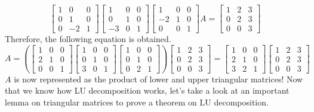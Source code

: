 \documentclass[../main.tex]{subfiles}
\begin{document}
\[
\begin{bmatrix}
    1 & 0  & 0 \\
    0 & 1  & 0 \\
    0 & -2 & 1
\end{bmatrix}
\begin{bmatrix}
    1  & 0 & 0 \\
    0  & 1 & 0 \\
    -3 & 0 & 1
\end{bmatrix}
\begin{bmatrix}
    1  & 0 & 0 \\
    -2 & 1 & 0 \\
    0  & 0 & 1
\end{bmatrix}
A
=
\begin{bmatrix}
    1 & 2 & 3 \\
    0 & 2 & 3 \\
    0 & 0 & 3
\end{bmatrix}
\]
Therefore, the following equation is obtained.
\[
A
= \left(
    \begin{bmatrix}
        1 & 0 & 0 \\
        2 & 1 & 0 \\
        0 & 0 & 1
    \end{bmatrix}
    \begin{bmatrix}
        1 & 0 & 0 \\
        0 & 1 & 0 \\
        3 & 0 & 1
    \end{bmatrix}
    \begin{bmatrix}
        1 & 0 & 0 \\
        0 & 1 & 0 \\
        0 & 2 & 1
    \end{bmatrix}
\right)
\begin{bmatrix}
    1 & 2 & 3 \\
    0 & 2 & 3 \\
    0 & 0 & 3
\end{bmatrix}
=
\begin{bmatrix}
    1 & 0 & 0 \\
    2 & 1 & 0 \\
    3 & 2 & 1
\end{bmatrix}
\begin{bmatrix}
    1 & 2 & 3 \\
    0 & 2 & 3 \\
    0 & 0 & 3
\end{bmatrix}
\]
$A$ is now represented as the product of lower and upper triangular
matrices! Now that we know how LU decomposition works, let's take
a look at an important lemma on triangular matrices to prove a
theorem on LU decomposition.
\end{document}
